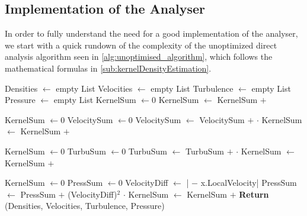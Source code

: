 \subsection{Implementation of the Analyser}\label{sec:kernelDensityEstimation}

In order to fully understand the need for a good implementation of the analyser, we start with a quick rundown of the complexity of the unoptimized direct analysis algorithm seen in \cref{alg:unoptimised_algorithm}, which follows the mathematical formulas in \cref{sub:kernelDensityEstimation}.

\begin{center}
\label{alg:unoptimised_algorithm}
\begin{algorithmic}[1]

\State Densities $\gets$ empty List
\State Velocities $\gets$ empty List
\State Turbulence $\gets$ empty List
\State Pressure $\gets$ empty List
    \State KernelSum $\gets 0$
        \State KernelSum $\gets$ KernelSum $+$ 
    \EndFor
    \State {}
\EndFor

    \State KernelSum $\gets 0$
    \State VelocitySum $\gets 0$
        \State VelocitySum $\gets$ VelocitySum $+$  $\cdot$ 
        \State KernelSum $\gets$ KernelSum $+$ 
    \EndFor
    \State {}
\EndFor

    \State KernelSum $\gets 0$
    \State TurbuSum $\gets 0$
        \State TurbuSum $\gets$ TurbuSum $+$  $\cdot$ 
        \State KernelSum $\gets$ KernelSum $+$ 
    \EndFor
    \State {}
\EndFor

    \State KernelSum $\gets 0$
    \State PressSum $\gets 0$
        \State VelocityDiff $\gets$ | $-$ x.LocalVelocity|
        \State PressSum $\gets$ PressSum $+$ (VelocityDiff)$^2$ $\cdot$ 
        \State KernelSum $\gets$ KernelSum $+$ 
    \EndFor
    \State {}
\EndFor
\State\textbf{Return} (Densities, Velocities, Turbulence, Pressure)
\EndFunction
\end{algorithmic}
\end{center}

